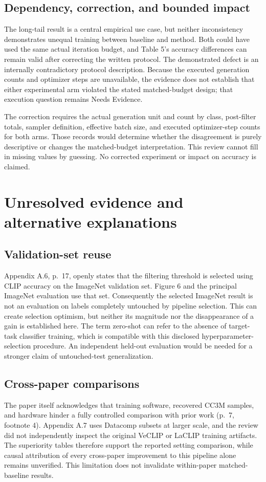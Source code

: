 \documentclass[10pt]{article}
\begin{document}
\subsection*{Dependency, correction, and bounded impact}
The long-tail result is a central empirical use case, but neither inconsistency demonstrates unequal training between baseline and method. Both could have used the same actual iteration budget, and Table 5’s accuracy differences can remain valid after correcting the written protocol. The demonstrated defect is an internally contradictory protocol description. Because the executed generation counts and optimizer steps are unavailable, the evidence does not establish that either experimental arm violated the stated matched-budget design; that execution question remains Needs Evidence.\par
The correction requires the actual generation unit and count by class, post-filter totals, sampler definition, effective batch size, and executed optimizer-step counts for both arms. Those records would determine whether the disagreement is purely descriptive or changes the matched-budget interpretation. This review cannot fill in missing values by guessing. No corrected experiment or impact on accuracy is claimed.\par
\section*{Unresolved evidence and alternative explanations}
\subsection*{Validation-set reuse}
Appendix A.6, p. 17, openly states that the filtering threshold is selected using CLIP accuracy on the ImageNet validation set. Figure 6 and the principal ImageNet evaluation use that set. Consequently the selected ImageNet result is not an evaluation on labels completely untouched by pipeline selection. This can create selection optimism, but neither its magnitude nor the disappearance of a gain is established here. The term zero-shot can refer to the absence of target-task classifier training, which is compatible with this disclosed hyperparameter-selection procedure. An independent held-out evaluation would be needed for a stronger claim of untouched-test generalization.\par
\subsection*{Cross-paper comparisons}
The paper itself acknowledges that training software, recovered CC3M samples, and hardware hinder a fully controlled comparison with prior work (p. 7, footnote 4). Appendix A.7 uses Datacomp subsets at larger scale, and the review did not independently inspect the original VeCLIP or LaCLIP training artifacts. The superiority tables therefore support the reported setting comparison, while causal attribution of every cross-paper improvement to this pipeline alone remains unverified. This limitation does not invalidate within-paper matched-baseline results.\par
\end{document}
